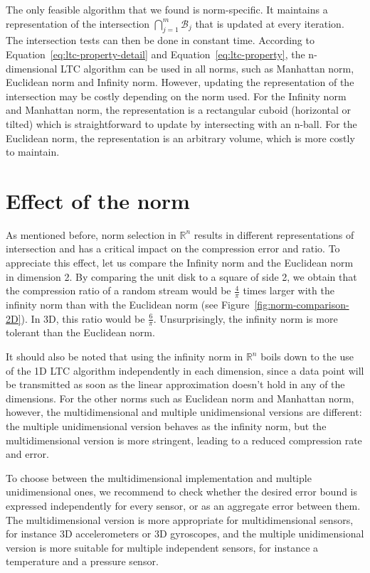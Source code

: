 The only feasible algorithm that we found is norm-specific. It
maintains a representation of the intersection
$\bigcap_{j=1}^{m}{\mathcal{B}_j}$ that is updated at every iteration.
The intersection tests can then be done in constant time. 
According to Equation~\eqref{eq:ltc-property-detail} and
Equation~\eqref{eq:ltc-property}, the n-dimensional LTC algorithm can be used in
all norms, such as Manhattan norm, Euclidean norm and Infinity norm.  However,
updating the representation of the intersection may be costly depending on the
norm used.  For the Infinity norm and Manhattan norm, the representation is a
rectangular cuboid (horizontal or tilted) which is straightforward to update by
intersecting with an n-ball. For the Euclidean norm, the representation is an
arbitrary volume, which is more costly to maintain.

\section{Effect of the norm}
\label{sec:effect-norm}

As mentioned before, norm selection in $\mathbb{R}^n$ results in different
representations of intersection and has a critical impact on the compression
error and ratio. To appreciate this effect, let us compare the Infinity norm and
the Euclidean norm in dimension 2. By comparing the unit disk to a square of
side 2, we obtain that the compression ratio of a random stream would be
$\frac{4}{\pi}$ times larger with the infinity norm than with the Euclidean norm
(see Figure~\ref{fig:norm-comparison-2D}). In 3D, this ratio would be
$\frac{6}{\pi}$. Unsurprisingly, the infinity norm is more tolerant than the
Euclidean norm.

It should also be noted that using the infinity norm in $\mathbb{R}^n$ boils
down to the use of the 1D LTC algorithm independently in each dimension, since a
data point will be transmitted as soon as the linear approximation doesn't hold
in any of the dimensions. For the other norms such as Euclidean norm and
Manhattan norm, however, the multidimensional and multiple unidimensional
versions are different: the multiple unidimensional version behaves as the
infinity norm, but the multidimensional version is more stringent, leading to a
reduced compression rate and error. 

To choose between the multidimensional implementation and multiple
unidimensional ones, we recommend to check whether the desired error bound is
expressed independently for every sensor, or as an aggregate error between them.
The multidimensional version is more appropriate for multidimensional sensors,
for instance 3D accelerometers or 3D gyroscopes, and the multiple unidimensional
version is more suitable for multiple independent sensors, for instance a
temperature and a pressure sensor.

